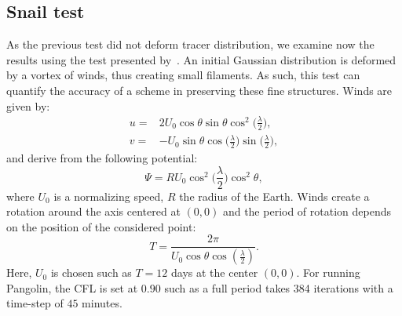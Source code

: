 \subsection{Snail test}
As the previous test did not deform tracer distribution, we examine now the
results using the test presented by~\cite{Hourdin1999}.  An initial Gaussian
distribution is deformed by a vortex of winds, thus creating small filaments. As
such, this test can quantify the accuracy of a scheme in preserving these fine
structures. Winds are given by:
\begin{align*}
  u =& 2 U_0 \cos{\theta} \sin{\theta} \cos^2 \Big(\frac{\lambda}{2}\Big), \\
  v =& -U_0 \sin{\theta} \cos \Big(\frac{\lambda}{2}\Big) 
  \sin \Big(\frac{\lambda}{2} \Big),
\end{align*}
and derive from the following potential:
\begin{equation}
  \Psi = 
  R U_0 \cos^2 \Big(\frac{\lambda}{2}\Big) \cos^2{\theta},
  \label{eqn:potential}
\end{equation}
where $U_0$ is a normalizing speed, $R$ the radius of the Earth.
Winds create a rotation around the axis centered at $(0,0)$ and the period of
rotation depends on the position of the considered point:
\begin{equation*}
  T = \frac{2\pi}{U_0 \cos \theta \cos(\frac{\lambda}{2})}.
\end{equation*}
Here, $U_0$ is chosen such as $T=12$ days at the center $(0, 0)$. For running Pangolin,
the CFL is set at $0.90$ such as a full period takes 384 iterations with a
time-step of $45$ minutes.

